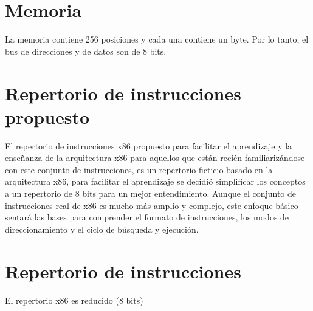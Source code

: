 \documentclass[12pt,twoside]{templates/unerthesis}
\begin{document}
\hypertarget{memoria}{%
\section{Memoria}\label{memoria}}

La memoria contiene 256 posiciones y cada una contiene un byte. Por lo tanto, el bus de direcciones y de datos son de 8 bits.

\hypertarget{repertorio-de-instrucciones-propuesto}{%
\section{Repertorio de instrucciones propuesto}\label{repertorio-de-instrucciones-propuesto}}

El repertorio de instrucciones x86 propuesto para facilitar el aprendizaje y la enseñanza de la arquitectura x86 para aquellos que están recién familiarizándose con este conjunto de instrucciones, es un repertorio ficticio basado en la arquitectura x86, para facilitar el aprendizaje se decidió simplificar los conceptos a un repertorio de 8 bits para un mejor entendimiento. Aunque el conjunto de instrucciones real de x86 es mucho más amplio y complejo, este enfoque básico sentará las bases para comprender el formato de instrucciones, los modos de direccionamiento y el ciclo de búsqueda y ejecución.

\hypertarget{repertorio-de-instrucciones-1}{%
\section{Repertorio de instrucciones}\label{repertorio-de-instrucciones-1}}

El repertorio x86 es reducido (8 bits)
\end{document}
